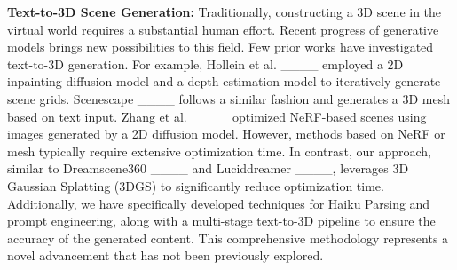 \noindent\textbf{Text-to-3D Scene Generation:}
    Traditionally, constructing a 3D scene in the virtual world requires a substantial human effort. Recent progress of generative models brings new possibilities to this field. Few prior works have investigated text-to-3D generation. For example, Hollein et al. ____ employed a 2D inpainting diffusion model and a depth estimation model to iteratively generate scene grids. Scenescape ____ follows a similar fashion and generates a 3D mesh based on text input. Zhang et al. ____ optimized NeRF-based scenes using images generated by a 2D diffusion model. However, methods based on NeRF or mesh typically require extensive optimization time. In contrast, our approach, similar to Dreamscene360 ____ and Luciddreamer ____, leverages 3D Gaussian Splatting (3DGS) to significantly reduce optimization time. Additionally, we have specifically developed techniques for Haiku Parsing and prompt engineering, along with a multi-stage text-to-3D pipeline to ensure the accuracy of the generated content. This comprehensive methodology represents a novel advancement that has not been previously explored.
\vspace{-0.2cm}